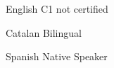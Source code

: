 
\begin{cvskills}

  \cvskill
    {English} %
    {C1 \tiny{not certified}} %


  \cvskill
    {Catalan} %
    {Bilingual} %

  \cvskill
    {Spanish} %
    {Native Speaker}


\end{cvskills}
